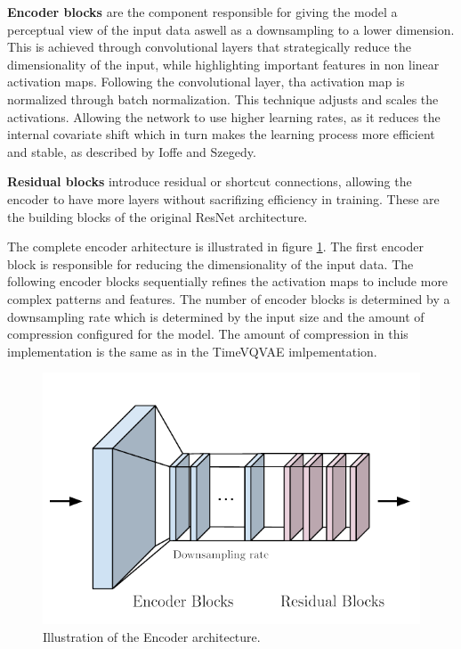 \textbf{Encoder blocks} are the component responsible for giving the model a perceptual view of the input data aswell as a downsampling to a lower dimension. This is achieved through convolutional layers that strategically reduce the dimensionality of the input, while highlighting important features in non linear activation maps. 
Following the convolutional layer, tha activation map is normalized through batch normalization. This technique adjusts and scales the activations. Allowing the network to use higher learning rates, as it reduces the internal covariate shift which in turn makes the learning process more efficient and stable, as described by Ioffe and Szegedy\cite{batchnorm}.

\textbf{Residual blocks} introduce residual or shortcut connections, allowing the encoder to have more layers without sacrifizing efficiency in training. 
These are the building blocks of the original ResNet architecture.

The complete encoder arhitecture is illustrated in figure \ref{fig:Encoder}. The first encoder block is responsible for reducing the dimensionality of the input data. The following encoder blocks sequentially refines the activation maps to include more complex patterns and features.
The number of encoder blocks is determined by a downsampling rate which is determined by the input size and the amount of compression configured for the model. The amount of compression in this implementation is the same as in the TimeVQVAE imlpementation.


\begin{figure}[H]
    \includegraphics[scale=0.8]{figures/figure-pdf/Encoder.pdf}
    \caption{Illustration of the Encoder architecture.}
    \label{fig:Encoder}
\end{figure}

